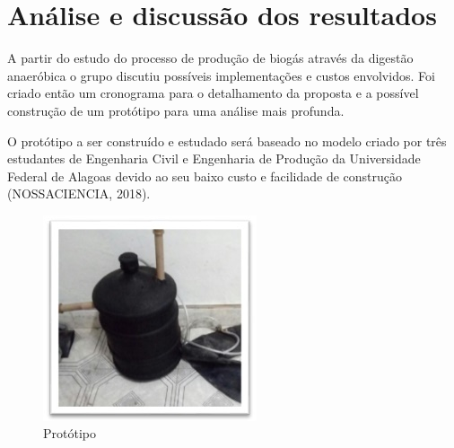 \chapter{Análise e discussão dos resultados}

A partir do estudo do processo de produção de biogás através da digestão anaeróbica o grupo discutiu possíveis implementações e custos envolvidos. Foi criado então um cronograma para o detalhamento da proposta e a possível construção de um protótipo para uma análise mais profunda. 

O protótipo a ser construído e estudado será baseado no modelo criado por três estudantes de Engenharia Civil e Engenharia de Produção da Universidade Federal de Alagoas devido ao seu baixo custo e facilidade de construção (NOSSACIENCIA, 2018).
\vspace{0.2cm}

\begin{figure}[htb]
	\begin{center}
	    \includegraphics[scale=1.0]{Prototipo.jpg}
	\end{center}
	\vspace*{-0.5cm}
	\caption{\label{fig_grafico}Protótipo}
\end{figure}